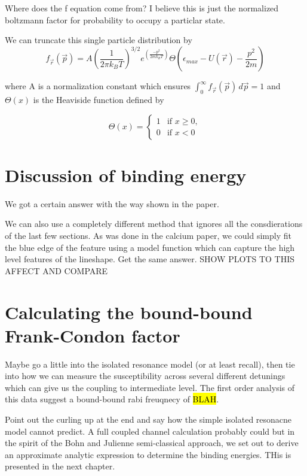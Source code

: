 Where does the f equation come from? I believe this is just the normalized boltzmann factor for probability to occupy a particlar state.

\noindent
We can truncate this single particle distribution by 
\begin{equation}
\label{eq:trun_single_particle_prob}
		 f_{ \vec{r} }( \vec{p} ) = A \left(\frac{1}{2 \pi k_B T}\right)^{3/2} e^{\left(\frac{-p^2}{2 m k_B T}\right)} \Theta \left( \epsilon_{max} - U( \vec{r} ) - \frac{p^2}{2 m} \right)
\end{equation}

\noindent
where A is a normalization constant which ensures $\int_0^\infty f_{ \vec{r} }( \vec{p} )\,d \vec{p} = 1 $ and $\Theta(x)$ is the Heaviside function defined by

\begin{equation}
\label{eq:heaviside}
	\Theta(x)=
	\begin{cases}
		1 &\text{if } x \geq 0, \\
		0 &\text{if } x < 0
	\end{cases}
\end{equation}


\section{Discussion of binding energy}
\label{sec:lowE_alt}

We got a certain answer with the way shown in the paper.

We can also use a completely different method that ignores all the consdierations of the last few sections. As was done in the calcium paper, we could simply fit the blue edge of the feature using a model function which can capture the high level features of the lineshape. Get the same answer. SHOW PLOTS TO THIS AFFECT AND COMPARE

\section{Calculating the bound-bound Frank-Condon factor}
\label{sec:lowE_coupling}

Maybe go a little into the isolated resonance model (or at least recall), then tie into how we can measure the susceptibility across several different detunings which can give us the coupling to intermediate level. The first order analysis of this data suggest a bound-bound rabi freuqnecy of \hl{BLAH}. 

Point out the curling up at the end and say how the simple isolated resonacne model cannot predict. A full coupled channel calculation probably could but in the spirit of the Bohn and Julienne semi-classical approach, we set out to derive an approximate analytic expression to determine the binding energies. THis is presented in the next chapter.






